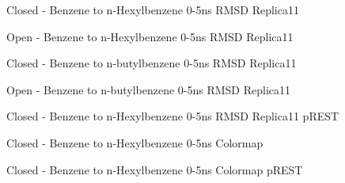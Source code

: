 \documentclass[T4paper.tex]{subfiles}
\begin{document}
\begin{figure}[!ht]
   \caption{Closed - Benzene to n-Hexylbenzene 0-5ns RMSD Replica11}
   \label{fig:c_opls3_1/RMSD-replica11}
\end{figure}

\begin{figure}[!h]
   \caption{Open - Benzene to n-Hexylbenzene 0-5ns RMSD Replica11}
   \label{fig:o_opls3_1/RMSD-replica11}
\end{figure}

\begin{figure}[!h]
   \caption{Closed - Benzene to n-butylbenzene 0-5ns RMSD Replica11}
   \label{fig:c_exp_opls3_11/RMSD-replica11}
\end{figure}

\begin{figure}[!h]
   \caption{Open - Benzene to n-butylbenzene 0-5ns RMSD Replica11}
   \label{fig:o_exp_opls3_24/RMSD-replica11}
\end{figure}

\begin{figure}[!ht]
   \caption{Closed - Benzene to n-Hexylbenzene 0-5ns RMSD Replica11 pREST}
   \label{fig:c_opls3_rest1_1/RMSD-replica11}
\end{figure}

\begin{figure}[!ht]
   \caption{Closed - Benzene to n-Hexylbenzene 0-5ns Colormap}
   \label{fig:c_opls3_1/colormap}
\end{figure}

\begin{figure}[!ht]
   \caption{Closed - Benzene to n-Hexylbenzene 0-5ns Colormap pREST}
   \label{fig:c_opls3_rest1_1/colormap}
\end{figure}
\end{document}
